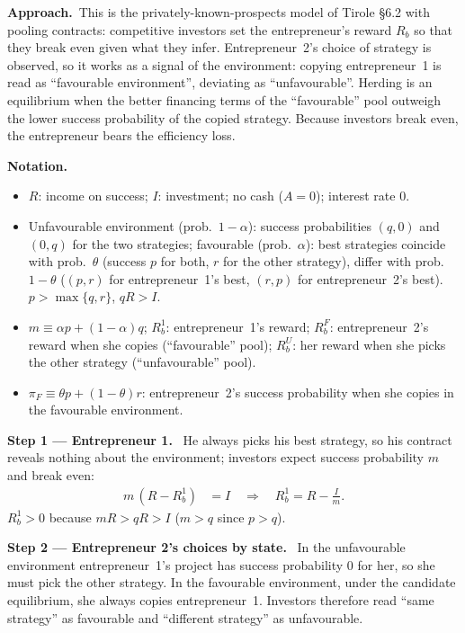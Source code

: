 \documentclass[11pt,a4paper]{article}
\newcommand{\notation}{\par\noindent\textbf{Notation.}}
\newcommand{\step}[2]{\par\medskip\noindent\textbf{Step #1 --- #2.}~}
\newcommand{\approach}{\par\smallskip\noindent\textbf{Approach.}~}
\begin{document}
\approach This is the privately-known-prospects model of Tirole \S6.2 with pooling contracts: competitive investors set the entrepreneur's reward $R_b$ so that they break even given what they infer. Entrepreneur~2's choice of strategy is observed, so it works as a signal of the environment: copying entrepreneur~1 is read as ``favourable environment'', deviating as ``unfavourable''. Herding is an equilibrium when the better financing terms of the ``favourable'' pool outweigh the lower success probability of the copied strategy. Because investors break even, the entrepreneur bears the efficiency loss.

\notation
\begin{itemize}
  \item $R$: income on success; $I$: investment; no cash ($A=0$); interest rate 0.
  \item Unfavourable environment (prob.\ $1-\alpha$): success probabilities $(q,0)$ and $(0,q)$ for the two strategies; favourable (prob.\ $\alpha$): best strategies coincide with prob.\ $\theta$ (success $p$ for both, $r$ for the other strategy), differ with prob.\ $1-\theta$ ($(p,r)$ for entrepreneur~1's best, $(r,p)$ for entrepreneur~2's best). $p>\max\{q,r\}$, $qR>I$.
  \item $m\equiv\alpha p+(1-\alpha)q$; $R_b^1$: entrepreneur~1's reward; $R_b^F$: entrepreneur~2's reward when she copies (``favourable'' pool); $R_b^U$: her reward when she picks the other strategy (``unfavourable'' pool).
  \item $\pi_F\equiv\theta p+(1-\theta)r$: entrepreneur~2's success probability when she copies in the favourable environment.
\end{itemize}

\step{1}{Entrepreneur 1} He always picks his best strategy, so his contract reveals nothing about the environment; investors expect success probability $m$ and break even:
\begin{align}
  m\,(R-R_b^1) &= I \quad\Longrightarrow\quad R_b^1 = R - \frac{I}{m}. \label{r5e11-R1}
\end{align}
$R_b^1>0$ because $mR>qR>I$ ($m>q$ since $p>q$).

\step{2}{Entrepreneur 2's choices by state} In the unfavourable environment entrepreneur~1's project has success probability 0 for her, so she must pick the other strategy. In the favourable environment, under the candidate equilibrium, she always copies entrepreneur~1. Investors therefore read ``same strategy'' as favourable and ``different strategy'' as unfavourable.
\end{document}
